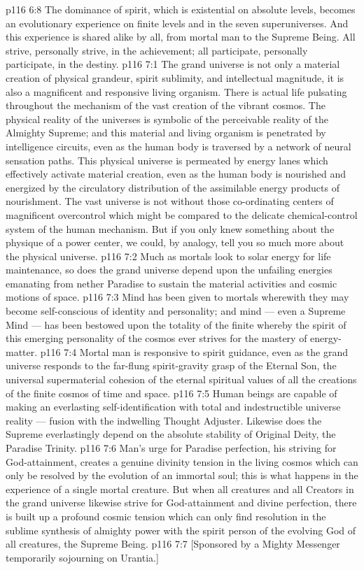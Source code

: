 \vs p116 6:8 The dominance of spirit, which is existential on absolute levels, becomes an evolutionary experience on finite levels and in the seven superuniverses. And this experience is shared alike by all, from mortal man to the Supreme Being. All strive, personally strive, in the achievement; all participate, personally participate, in the destiny.
\vs p116 7:1 The grand universe is not only a material creation of physical grandeur, spirit sublimity, and intellectual magnitude, it is also a magnificent and responsive living organism. There is actual life pulsating throughout the mechanism of the vast creation of the vibrant cosmos. The physical reality of the universes is symbolic of the perceivable reality of the Almighty Supreme; and this material and living organism is penetrated by intelligence circuits, even as the human body is traversed by a network of neural sensation paths. This physical universe is permeated by energy lanes which effectively activate material creation, even as the human body is nourished and energized by the circulatory distribution of the assimilable energy products of nourishment. The vast universe is not without those co\hyp{}ordinating centers of magnificent overcontrol which might be compared to the delicate chemical\hyp{}control system of the human mechanism. But if you only knew something about the physique of a power center, we could, by analogy, tell you so much more about the physical universe.
\vs p116 7:2 Much as mortals look to solar energy for life maintenance, so does the grand universe depend upon the unfailing energies emanating from nether Paradise to sustain the material activities and cosmic motions of space.
\vs p116 7:3 Mind has been given to mortals wherewith they may become self\hyp{}conscious of identity and personality; and mind --- even a Supreme Mind --- has been bestowed upon the totality of the finite whereby the spirit of this emerging personality of the cosmos ever strives for the mastery of energy\hyp{}matter.
\vs p116 7:4 Mortal man is responsive to spirit guidance, even as the grand universe responds to the far\hyp{}flung spirit\hyp{}gravity grasp of the Eternal Son, the universal supermaterial cohesion of the eternal spiritual values of all the creations of the finite cosmos of time and space.
\vs p116 7:5 Human beings are capable of making an everlasting self\hyp{}identification with total and indestructible universe reality --- fusion with the indwelling Thought Adjuster. Likewise does the Supreme everlastingly depend on the absolute stability of Original Deity, the Paradise Trinity.
\vs p116 7:6 Man’s urge for Paradise perfection, his striving for God\hyp{}attainment, creates a genuine divinity tension in the living cosmos which can only be resolved by the evolution of an immortal soul; this is what happens in the experience of a single mortal creature. But when all creatures and all Creators in the grand universe likewise strive for God\hyp{}attainment and divine perfection, there is built up a profound cosmic tension which can only find resolution in the sublime synthesis of almighty power with the spirit person of the evolving God of all creatures, the Supreme Being.
\vsetoff
\vs p116 7:7 [Sponsored by a Mighty Messenger temporarily sojourning on Urantia.]
